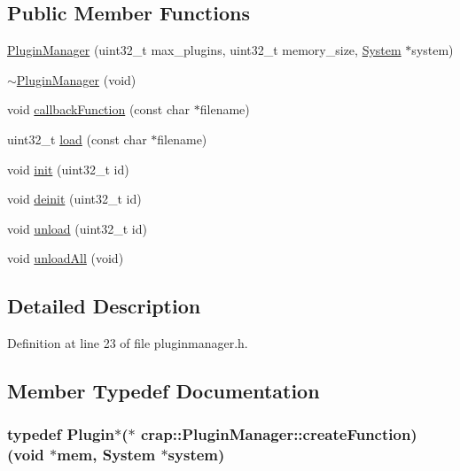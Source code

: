 \subsection*{Public Member Functions}
\begin{DoxyCompactItemize}
\item 
\hyperlink{classcrap_1_1_plugin_manager_af82042d7693463ada8a47d9c65b04d39}{Plugin\+Manager} (uint32\+\_\+t max\+\_\+plugins, uint32\+\_\+t memory\+\_\+size, \hyperlink{classcrap_1_1_system}{System} $\ast$system)
\item 
\hyperlink{classcrap_1_1_plugin_manager_ab869462fb661b66250993fce61e79aa6}{$\sim$\+Plugin\+Manager} (void)
\item 
void \hyperlink{classcrap_1_1_plugin_manager_a7548355a8ce684222edb2b92ba92eabb}{callback\+Function} (const char $\ast$filename)
\item 
uint32\+\_\+t \hyperlink{classcrap_1_1_plugin_manager_a032a19b50c263c5aa16275bff27f40d9}{load} (const char $\ast$filename)
\item 
void \hyperlink{classcrap_1_1_plugin_manager_aeeb4e23438881a48fa0bda0b1885a188}{init} (uint32\+\_\+t id)
\item 
void \hyperlink{classcrap_1_1_plugin_manager_a3e26eecc143191eeb14945ccd4e51e83}{deinit} (uint32\+\_\+t id)
\item 
void \hyperlink{classcrap_1_1_plugin_manager_a8d7bf2d50979c84ccd4c669e1fc89f16}{unload} (uint32\+\_\+t id)
\item 
void \hyperlink{classcrap_1_1_plugin_manager_a74669b5ebf7c9fe9f8c48abefc45f426}{unload\+All} (void)
\end{DoxyCompactItemize}


\subsection{Detailed Description}


Definition at line 23 of file pluginmanager.\+h.



\subsection{Member Typedef Documentation}
\hypertarget{classcrap_1_1_plugin_manager_a89bf653ef8bdebe88020af12ad62a2ab}{}
\subsubsection[{create\+Function}]{\setlength{\rightskip}{0pt plus 5cm}typedef {\bf Plugin}$\ast$($\ast$ crap\+::\+Plugin\+Manager\+::create\+Function) (void $\ast${\bf mem}, {\bf System} $\ast$system)}\label{classcrap_1_1_plugin_manager_a89bf653ef8bdebe88020af12ad62a2ab}



